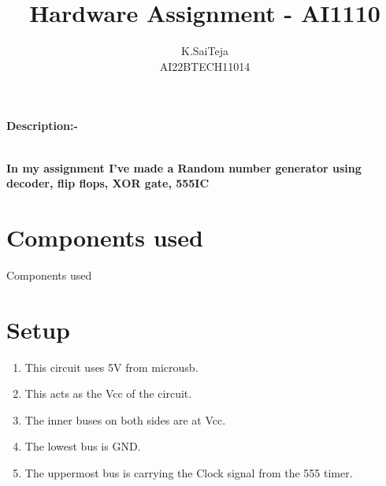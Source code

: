 \documentclass[journal,12pt,twocolumn]{IEEEtran}
\begin{document}
		\title{
				Hardware Assignment - AI1110
		}
		\author{K.SaiTeja\\
			AI22BTECH11014
		}	
		
\maketitle

\newpage
\bigskip
\renewcommand{\thefigure}{\theenumi}
\renewcommand{\thetable}{\theenumi}
\textbf{Description:-} \raggedright\\
\textbf{In my assignment I've made a Random number generator using decoder, flip flops, XOR gate, 555IC}
\tableofcontents
\section{Components used}
\begin{table}[htbp]
	\label{tab:Hardware_Assignment}
	
	\caption{Components used}
\end{table}
\section{Setup}
\begin{enumerate}
\item This circuit uses 5V from microusb.
\item This acts as the Vcc of the circuit.
\item The inner buses on both sides are at Vcc.
\item The lowest bus is GND.
\item The uppermost bus is carrying the Clock signal from the 555 timer.
\end{enumerate}
\end{document}
